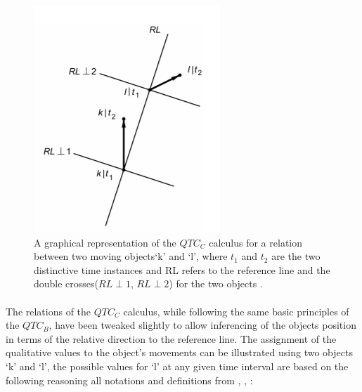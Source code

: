	\newpage
	
	\begin{figure}[h!]
		\centering
		\includegraphics[scale=1]{images/QTCC}
		\caption{A graphical representation of the $QTC_C$ calculus for a relation between two moving objects`k' and `l', where $t_1$ and $t_2$ are the two distinctive time instances and RL refers to the reference line and the double crosses($RL\perp1$, $RL\perp2$) for the two objects \cite{van2005qualitative} .}
		\label{fig:qtcc}
	\end{figure}

	\paragraph{}The relations of the $QTC_C$ calculus, while following the same basic principles of the $QTC_B$, have been tweaked slightly to allow inferencing of the objects position in terms of the relative direction to the reference line. The assignment of the qualitative values to the object's movements can be illustrated using two objects `k' and `l', the possible values for `l' at any given time interval are based on the following reasoning all notations and definitions from \cite{van2004representing}, \cite{van2006qualitative}, \cite{van2005qualitative}:
	
